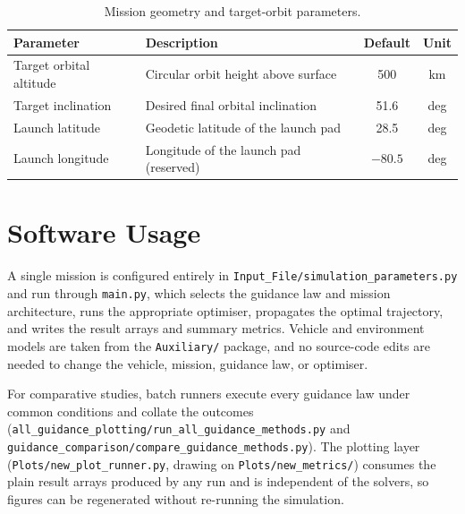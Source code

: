 \begin{table}[htbp]
  \centering
  \caption{Mission geometry and target-orbit parameters.}
  \label{tab:param_mission}
  \begin{tabular}{l l c c}
    \toprule
    \textbf{Parameter} & \textbf{Description} & \textbf{Default} & \textbf{Unit} \\
    \midrule
    Target orbital altitude    & Circular orbit height above surface
                               & 500       & km   \\
    Target inclination         & Desired final orbital inclination
                               & 51.6      & deg  \\
    Launch latitude            & Geodetic latitude of the launch pad
                               & 28.5      & deg  \\
    Launch longitude           & Longitude of the launch pad (reserved)
                               & $-80.5$   & deg  \\
    \bottomrule
  \end{tabular}
\end{table}

\section{Software Usage}
\label{sec:software}

A single mission is configured entirely in
\texttt{Input\_File/simulation\_parameters.py} and run through \texttt{main.py},
which selects the guidance law and mission architecture, runs the appropriate
optimiser, propagates the optimal trajectory, and writes the result arrays and
summary metrics. Vehicle and environment models are taken from the
\texttt{Auxiliary/} package, and no source-code edits are needed to change the
vehicle, mission, guidance law, or optimiser.

For comparative studies, batch runners execute every guidance law under common
conditions and collate the outcomes
(\texttt{all\_guidance\_plotting/run\_all\_guidance\_methods.py} and
\texttt{guidance\_comparison/compare\_guidance\_methods.py}). The plotting layer
(\texttt{Plots/new\_plot\_runner.py}, drawing on \texttt{Plots/new\_metrics/})
consumes the plain result arrays produced by any run and is independent of the
solvers, so figures can be regenerated without re-running the simulation.
